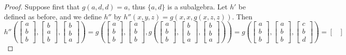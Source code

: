 \documentclass[11pt]{amsart}
\theoremstyle{definition}
\theoremstyle{remark}
\theoremstyle{plain}
\begin{document}
\begin{enumerate}[wide, labelindent=0pt]
\begin{proof}
Suppose first that $g(a,d,d)=a$, thus $\{a,d\}$ is a subalgebra. Let $h'$ be defined as before, and we define $h''$ by $h''(x,y,z)=g(x,x,g(x,z,z))$. Then 
\begin{equation*}
h''\left(
\begin{bmatrix}
a \\
b \\
b
\end{bmatrix}\!,\!
\begin{bmatrix}
b \\
a \\
b
\end{bmatrix}\!,\!
\begin{bmatrix}
b \\
b \\
a
\end{bmatrix}
\right)=
g\left(
\begin{bmatrix}
a \\
b \\
b
\end{bmatrix}\!,\!
\begin{bmatrix}
a \\
b \\
b
\end{bmatrix}\!,\!
g\left(
\begin{bmatrix}
a \\
b \\
b
\end{bmatrix}\!,\!
\begin{bmatrix}
b \\
b \\
a
\end{bmatrix}\!,\!
\begin{bmatrix}
b \\
b \\
a
\end{bmatrix}
\right)
\right)=
g\left(
\begin{bmatrix}
a \\
b \\
b
\end{bmatrix}\!,\!
\begin{bmatrix}
a \\
b \\
b
\end{bmatrix}\!,\!
\begin{bmatrix}
c \\
b \\
d
\end{bmatrix}
\right)=
\begin{bmatrix}

\end{bmatrix}
\end{equation*}
\end{proof}
\end{enumerate}
\end{document}
